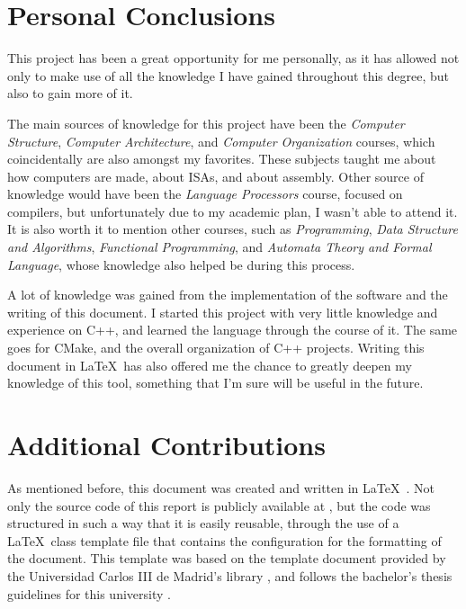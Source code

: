 \section{Personal Conclusions}\label{sec:personal-conclusions}
This project has been a great opportunity for me personally, as it has allowed not only to make use of all the knowledge I have gained throughout this degree, but also to gain more of it.

The main sources of knowledge for this project have been the \textit{Computer Structure}, \textit{Computer Architecture}, and \textit{Computer Organization} courses, which coincidentally are also amongst my favorites. These subjects taught me about how computers are made, about \glspl{ISA}, and about \gls{assembly}. Other source of knowledge would have been the \textit{Language Processors} course, focused on compilers, but unfortunately due to my academic plan, I wasn't able to attend it.
It is also worth it to mention other courses, such as \textit{Programming}, \textit{Data Structure and Algorithms}, \textit{Functional Programming}, and \textit{Automata Theory and Formal Language}, whose knowledge also helped be during this process.

A lot of knowledge was gained from the implementation of the software and the writing of this document. I started this project with very little knowledge and experience on C++, and learned the language through the course of it. The same goes for CMake, and the overall organization of C++ projects. Writing this document in \LaTeX~has also offered me the chance to greatly deepen my knowledge of this tool, something that I'm sure will be useful in the future.



\section{Additional Contributions}\label{sec:contributions}
As mentioned before, this document was created and written in \LaTeX~\parencite{lamport1986latex}. Not only the source code of this report is publicly available at \myrepo, but the code was structured in such a way that it is easily reusable, through the use of a \LaTeX~class template file that contains the configuration for the formatting of the document. This template was based on the template document provided by the Universidad Carlos III de Madrid's library \parencite{UC3MthesisTemplate}, and follows the bachelor's thesis guidelines for this university \parencite{UC3MthesisStyleGuide}.

